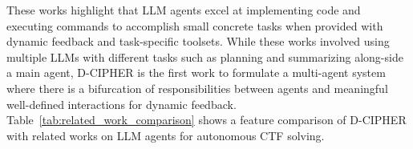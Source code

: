 These works highlight that LLM agents excel at implementing code and executing commands to accomplish small concrete tasks when provided with dynamic feedback and task-specific toolsets. While these works  involved using multiple LLMs with different tasks such as planning and summarizing along-side a main agent, D-CIPHER is the first work to formulate a multi-agent system where there is a bifurcation of responsibilities between agents and meaningful well-defined interactions for dynamic feedback.
Table~\ref{tab:related_work_comparison} shows a feature comparison of D-CIPHER with related works on LLM agents for autonomous CTF solving.




